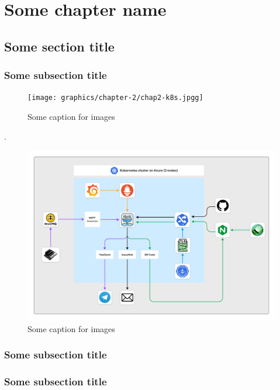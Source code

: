 \chapter{Some chapter name}

\section{Some section title}

\blindtext

\subsection{Some subsection title}
\blindtext
\blindtext
\begin{figure}
    \centering
    \texttt{[image: graphics/chapter-2/chap2-k8s.jpgg]}
    \caption{Some caption for images}
    \label{fig:chap2-k8s}
\end{figure}
\blindtext
\blindtext \cite{vladimir2021cloudcomputing}.
\begin{figure}
    \centering
    \includegraphics[scale=0.25]{graphics/chapter-1/chap1-architecture.png}
    \caption{Some caption for images\cite{mcafee2020risk}}
    \label{fig:chap1-architecture}
\end{figure}
\subsection{Some subsection title}
\blindtext
\blindtext

\subsection{Some subsection title}
\blindtext
\blindtext \cite{mcafee2020risk}
\blindtext
\blindtext
\blindtext
